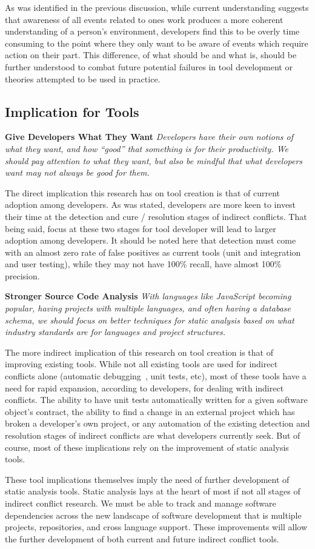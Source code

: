 As was identified in the previous discussion, while current understanding suggests that awareness of all events related to ones work
produces a more coherent understanding of a person's environment, developers find this to be overly time consuming
to the point where they only want to be aware of events which require action on their part. This difference, of what 
should be and what is, should be further understood to combat future potential failures in
tool development or theories attempted to be used in practice.

\subsection{Implication for Tools}
\label{sec:implt}

\textbf{Give Developers What They Want} \textit{Developers have their own notions of what they want, and how ``good''
that something is for their productivity. We should pay attention to what they want, but also be mindful that what
developers want may not always be good for them.}

The direct implication this research has on tool creation is that of current adoption among developers. As was stated,
developers are more keen to invest their time at the detection and cure / resolution stages of indirect conflicts. That being 
said, focus at these two stages for tool developer will lead to larger adoption among developers.
It should be noted here that detection must come with an almost zero rate of false positives as
current tools (unit and integration and user testing), while they may not have 100\% recall, have almost 100\% precision.

\textbf{Stronger Source Code Analysis} \textit{With languages like JavaScript becoming popular, having projects with
multiple languages, and often having a database schema, we should focus on better techniques for static analysis based
on what industry standards are for languages and project structures.}

The more indirect implication of this research on tool creation is that of improving existing tools. While not all existing
tools are used for indirect conflicts alone (automatic debugging~\cite{Zeller:2005:WPF}, unit tests, etc), most of these tools
have a need for rapid expansion, according to developers, for dealing with indirect conflicts. The ability to have unit tests
automatically written for a given software object's contract, the ability to find a change  in an external project
which has broken a developer's own project, or any automation of the existing detection and resolution stages of indirect
conflicts are what developers currently seek. But of course, most of these implications rely on the improvement of 
static analysis tools.

These tool implications themselves imply the need of further development of static analysis tools. Static 
analysis lays at the heart of most if not all stages of indirect conflict research. We must be able to track and manage
software dependencies across the new landscape of software development that is multiple projects, repositories, and cross
language support. These improvements will allow the further development of both current and future indirect conflict
tools.

